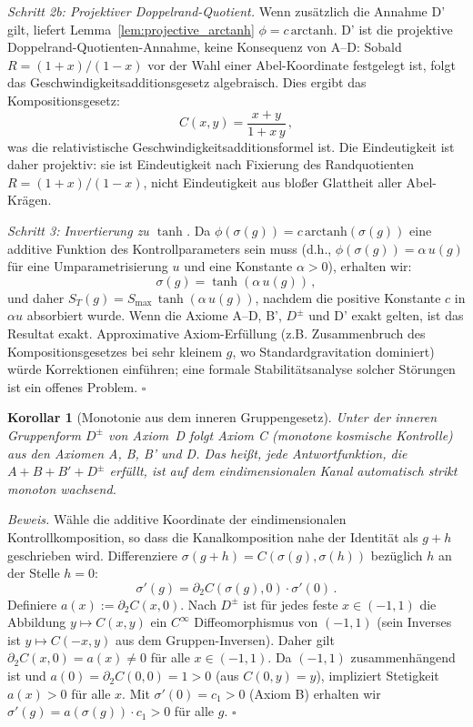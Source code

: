 \documentclass[aps,prd,twocolumn,superscriptaddress,nofootinbib]{revtex4-2}
\newtheorem{corollary}{Korollar}
\begin{document}
\textit{Schritt 2b: Projektiver Doppelrand-Quotient.}
Wenn zusätzlich die Annahme D' gilt, liefert Lemma~\ref{lem:projective_arctanh} $\phi=c\,\mathrm{arctanh}$. D' ist die projektive Doppelrand-Quotienten-Annahme, keine Konsequenz von A--D: Sobald $R=(1+x)/(1-x)$ vor der Wahl einer Abel-Koordinate festgelegt ist, folgt das Geschwindigkeitsadditionsgesetz algebraisch. Dies ergibt das Kompositionsgesetz:
\begin{equation}
C(x, y) = \frac{x + y}{1 + x\,y}\,,
\label{eq:addition_formula}
\end{equation}
was die relativistische Geschwindigkeitsadditionsformel ist. Die Eindeutigkeit ist daher projektiv: sie ist Eindeutigkeit nach Fixierung des Randquotienten $R=(1+x)/(1-x)$, nicht Eindeutigkeit aus bloßer Glattheit aller Abel-Krägen.

\textit{Schritt 3: Invertierung zu $\tanh$.}
Da $\phi(\sigma(g)) = c\,\mathrm{arctanh}(\sigma(g))$ eine additive Funktion des Kontrollparameters sein muss (d.h., $\phi(\sigma(g)) = \alpha\,u(g)$ für eine Umparametrisierung $u$ und eine Konstante $\alpha > 0$), erhalten wir:
\begin{equation}
\sigma(g) = \tanh(\alpha\,u(g))\,,
\end{equation}
und daher $S_T(g) = S_{\max}\,\tanh(\alpha\,u(g))$, nachdem die positive Konstante $c$ in $\alpha u$ absorbiert wurde. Wenn die Axiome A--D, B', $D^\pm$ und D' exakt gelten, ist das Resultat exakt. Approximative Axiom-Erfüllung (z.B. Zusammenbruch des Kompositionsgesetzes bei sehr kleinem $g$, wo Standardgravitation dominiert) würde Korrektionen einführen; eine formale Stabilitätsanalyse solcher Störungen ist ein offenes Problem. \hfill $\square$

\begin{corollary}[Monotonie aus dem inneren Gruppengesetz]
\label{cor:monotonicity}
Unter der inneren Gruppenform $D^\pm$ von Axiom~D folgt Axiom C (monotone kosmische Kontrolle) aus den Axiomen A, B, B' und D. Das heißt, jede Antwortfunktion, die $A + B + B' + D^\pm$ erfüllt, ist auf dem eindimensionalen Kanal automatisch strikt monoton wachsend.
\end{corollary}

\textit{Beweis.} Wähle die additive Koordinate der eindimensionalen Kontrollkomposition, so dass die Kanalkomposition nahe der Identität als $g+h$ geschrieben wird. Differenziere $\sigma(g + h) = C(\sigma(g), \sigma(h))$ bezüglich $h$ an der Stelle $h = 0$:
\[
\sigma'(g) = \partial_2 C(\sigma(g), 0) \cdot \sigma'(0)\,.
\]
Definiere $a(x) := \partial_2 C(x, 0)$. Nach $D^\pm$ ist für jedes feste $x \in (-1,1)$ die Abbildung $y \mapsto C(x,y)$ ein $C^\infty$ Diffeomorphismus von $(-1,1)$ (sein Inverses ist $y \mapsto C(-x, y)$ aus dem Gruppen-Inversen). Daher gilt $\partial_2 C(x, 0) = a(x) \neq 0$ für alle $x \in (-1,1)$. Da $(-1,1)$ zusammenhängend ist und $a(0) = \partial_2 C(0,0) = 1 > 0$ (aus $C(0,y) = y$), impliziert Stetigkeit $a(x) > 0$ für alle $x$. Mit $\sigma'(0) = c_1 > 0$ (Axiom B) erhalten wir $\sigma'(g) = a(\sigma(g)) \cdot c_1 > 0$ für alle $g$. \hfill $\square$
\end{document}
